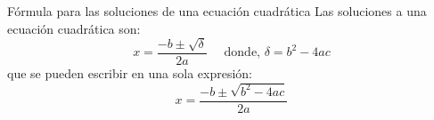 \begin{infocard}{Fórmula para las soluciones de una ecuación cuadrática}
    Las soluciones a una ecuación cuadrática son:
    \[
        x = \frac{-b\pm \sqrt{\delta}}{2a} \quad \text{ donde, }\delta=b^2-4ac
    \]
    que se pueden escribir en una sola expresión:
    \[x= \dfrac{-b\pm\sqrt{b^2-4ac}}{2a}\]
\end{infocard}